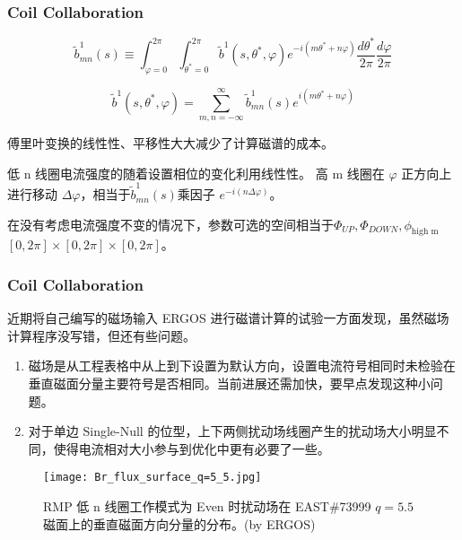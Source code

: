\begin{frame}
  \frametitle{Coil Collaboration}
  $$\tilde{b}_{m n}^{1}(s) \equiv \int_{\varphi=0}^{2 \pi} \int_{\theta^{*}=0}^{2 \pi} \tilde{b}^{1}\left(s, \theta^{*}, \varphi\right) e^{-i\left(m \theta^{*}+n \varphi\right)} \frac{d \theta^{*}}{2 \pi} \frac{d \varphi}{2 \pi}$$

  $$\tilde{b}^{1}\left(s, \theta^{*}, \varphi\right)=\sum_{m, n=-\infty}^{\infty} \tilde{b}_{m n}^{1}(s) e^{i\left(m \theta^{*}+n \varphi\right)}$$

  傅里叶变换的线性性、平移性大大减少了计算磁谱的成本。

  低 n 线圈电流强度的随着设置相位的变化利用线性性。
  高 m 线圈在 $\varphi$ 正方向上进行移动 $\Delta \varphi$，相当于$\tilde{b}_{m n}^{1}(s)$乘因子 $e^{-i\left(n \Delta\varphi \right )}$。

  在没有考虑电流强度不变的情况下，参数可选的空间相当于$\Phi_{UP}, \Phi_{DOWN}, \phi_{\text{high m}}$ $[0, 2\pi]\times[0,2\pi]\times[0,2\pi]$。

\end{frame}

\begin{frame}
  \frametitle{Coil Collaboration}
  近期将自己编写的磁场输入 ERGOS 进行磁谱计算的试验一方面发现，虽然磁场计算程序没写错，但还有些问题。

  \begin{enumerate}
    \item 磁场是从工程表格中从上到下设置为默认方向，设置电流符号相同时未检验在垂直磁面分量主要符号是否相同。当前进展还需加快，要早点发现这种小问题。
    \item 对于单边 Single-Null 的位型，上下两侧扰动场线圈产生的扰动场大小明显不同，使得电流相对大小参与到优化中更有必要了一些。
  \end{enumerate}

  
  \begin{figure}[htbp]
    \centering%
    \texttt{[image: Br\_flux\_surface\_q=5\_5.jpg]}
    \caption{RMP 低 n 线圈工作模式为 Even 时扰动场在 EAST\#73999 $q=5.5$ 磁面上的垂直磁面方向分量的分布。(by ERGOS\cite{nardon_edge_2007})}
  \end{figure}
  
\end{frame}


